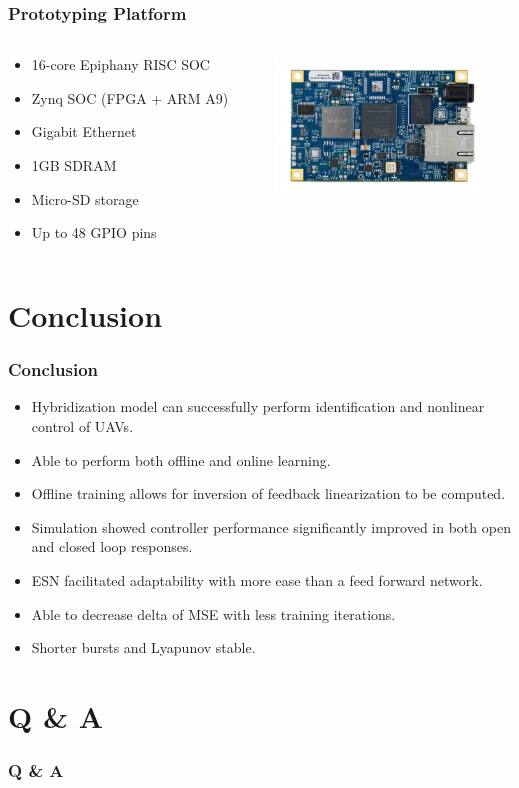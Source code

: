 \documentclass{beamer}
\begin{document}
   \begin{frame}
      \frametitle{Prototyping Platform}
      \begin{columns}[T]
         \begin{column}[T]{5cm}
            \begin{itemize}
               \item 16-core Epiphany RISC SOC
               \item Zynq SOC (FPGA + ARM A9)
               \item Gigabit Ethernet
               \item 1GB SDRAM
               \item Micro-SD storage
               \item Up to 48 GPIO pins
            \end{itemize}
         \end{column}
         \begin{column}[T]{5cm}
            \includegraphics[height=3.7cm]{parallela}
         \end{column}
      \end{columns} 
   \end{frame}

   \section{Conclusion}
 
   \begin{frame}
      \frametitle{Conclusion}
      \begin{itemize}
         \item Hybridization model can successfully perform identification and nonlinear control of UAVs.
         \item Able to perform both offline and online learning.
         \item Offline training allows for inversion of feedback linearization to be computed.
         \item Simulation showed controller performance significantly improved in both open and closed loop responses.
         \item ESN facilitated adaptability with more ease than a feed forward network.
         \item Able to decrease delta of MSE with less training iterations.
         \item Shorter bursts and Lyapunov stable.
      \end{itemize}
   \end{frame}

   \section{Q \& A}

   \begin{frame}
      \frametitle{Q \& A}
   \end{frame}
\end{document}
